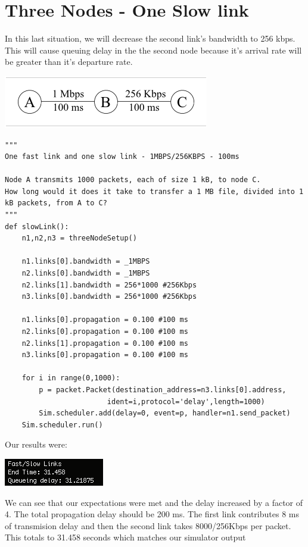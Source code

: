 \documentclass[11pt]{article}
\begin{document}
\section{Three Nodes - One Slow link}



In this last situation, we will decrease the second link's bandwidth to 256 kbps. This will cause queuing delay in the the second node because it's arrival rate will be greater than it's departure rate.

\includegraphics{ThreeSlow.png}

\begin{lstlisting}
"""
One fast link and one slow link - 1MBPS/256KBPS - 100ms

Node A transmits 1000 packets, each of size 1 kB, to node C. 
How long would it does it take to transfer a 1 MB file, divided into 1 kB packets, from A to C?
"""
def slowLink():
    n1,n2,n3 = threeNodeSetup()

    n1.links[0].bandwidth = _1MBPS
    n2.links[0].bandwidth = _1MBPS
    n2.links[1].bandwidth = 256*1000 #256Kbps
    n3.links[0].bandwidth = 256*1000 #256Kbps

    n1.links[0].propagation = 0.100 #100 ms
    n2.links[0].propagation = 0.100 #100 ms
    n2.links[1].propagation = 0.100 #100 ms
    n3.links[0].propagation = 0.100 #100 ms

    for i in range(0,1000):
        p = packet.Packet(destination_address=n3.links[0].address,
                        ident=i,protocol='delay',length=1000)
        Sim.scheduler.add(delay=0, event=p, handler=n1.send_packet)
    Sim.scheduler.run()
\end{lstlisting}

Our results were:

\includegraphics{3slow.png}

We can see that our expectations were met and the delay increased by a factor of 4. 
The total propagation delay should be 200 ms. The first link contributes 8 ms of transmision delay and then the second link takes 8000/256Kbps per packet. This totals to 31.458 seconds which matches our simulator output
\end{document}
